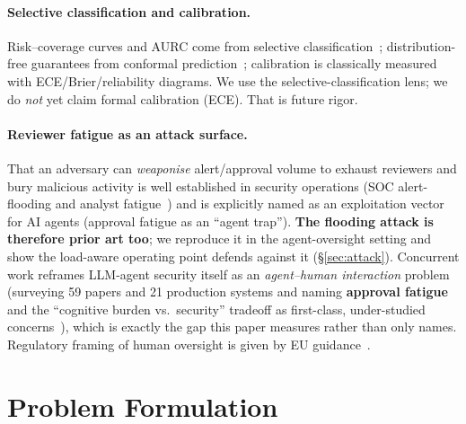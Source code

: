 \documentclass[11pt]{article}
\begin{document}
\paragraph{Selective classification and calibration.} Risk--coverage curves and AURC come from
selective classification~\cite{geifman17}; distribution-free guarantees from conformal
prediction~\cite{angelopoulos21}; calibration is classically measured with ECE/Brier/reliability
diagrams. We use the selective-classification lens; we do \emph{not} yet claim formal calibration
(ECE). That is future rigor.

\paragraph{Reviewer fatigue as an attack surface.} That an adversary can \emph{weaponise}
alert/approval volume to exhaust reviewers and bury malicious activity is well established in security
operations (SOC alert-flooding and analyst fatigue~\cite{tariq25}) and is explicitly named as an
exploitation vector for AI agents (approval fatigue as an ``agent trap''). \textbf{The flooding
attack is therefore prior art too}; we reproduce it in the agent-oversight setting and show the
load-aware operating point defends against it (\S\ref{sec:attack}). Concurrent work reframes LLM-agent
security itself as an \emph{agent--human interaction} problem (surveying 59 papers and 21
production systems and naming \textbf{approval fatigue} and the ``cognitive burden vs.\ security''
tradeoff as first-class, under-studied concerns~\cite{wang25}), which is exactly the gap this paper
measures rather than only names. Regulatory framing of human oversight is given by EU
guidance~\cite{edps25}.

\section{Problem Formulation}\label{sec:problem}
\end{document}
